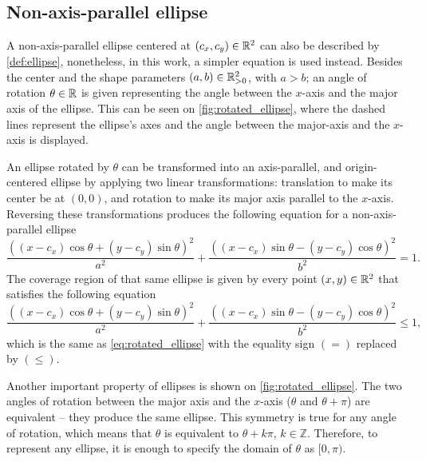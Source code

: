 \subsection{Non-axis-parallel ellipse}

A non-axis-parallel ellipse centered at $(c_x, c_y)\in\mathbb{R}^2$ can also be described by \autoref{def:ellipse}, nonetheless, in this work,  a simpler equation is used instead. 
Besides the center and the shape parameters $(a, b) \in \mathbb{R}^2_{>0}$, with $a > b$; an angle of rotation $\theta \in \mathbb{R}$ is given representing the angle between the $x$-axis and the major axis of the ellipse. This can be seen on \autoref{fig:rotated_ellipse}, where the dashed lines represent the ellipse's axes and the angle between the major-axis and the $x$-axis is displayed.

An ellipse rotated by $\theta$ can be transformed into an axis-parallel, and origin-centered ellipse by applying two linear transformations: translation to make its center be at $(0, 0)$, and rotation to make its major axis parallel to the $x$-axis. Reversing these transformations produces the following equation for a non-axis-parallel ellipse
\begin{equation}\label{eq:rotated_ellipse}
\dfrac{((x-c_x)\cos\theta + (y-c_y)\sin\theta)^2}{a^2}+\dfrac{((x-c_x)\sin\theta - (y-c_y)\cos\theta)^2}{b^2}=1.
\end{equation}
The coverage region of that same ellipse is given by every point $(x, y)\in\mathbb{R}^2$ that satisfies the following equation
\begin{equation}\label{eq:rotated_ellipse_co}
\dfrac{((x-c_x)\cos\theta + (y-c_y)\sin\theta)^2}{a^2}+\dfrac{((x-c_x)\sin\theta - (y-c_y)\cos\theta)^2}{b^2}\le 1,
\end{equation}
which is the same as \autoref{eq:rotated_ellipse} with the equality sign $(=)$ replaced by $(\le)$.

Another important property of ellipses is shown on \autoref{fig:rotated_ellipse}. The two angles of rotation between the major axis and the $x$-axis ($\theta$ and $\theta+\pi$) are equivalent -- they produce the same ellipse. This symmetry is true for any angle of rotation, which means that $\theta$ is equivalent to $\theta+k\pi$, $k\in\mathbb{Z}$. Therefore, to represent any ellipse, it is enough to specify the domain of $\theta$ as $[0, \pi)$.

